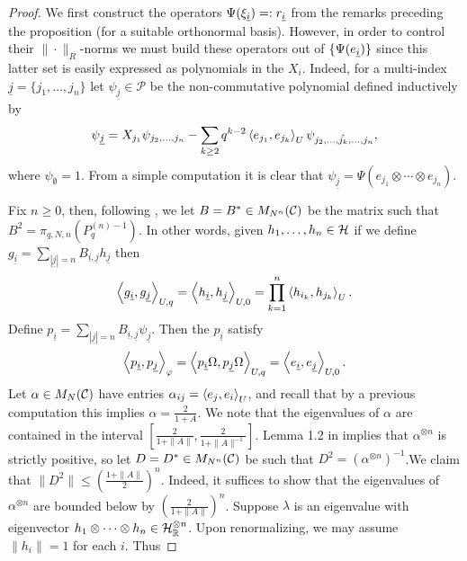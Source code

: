 \begin{proof}
We first construct the operators $\Psi(\xi_{\underline{i}})=:r_{\underline{i}}$ from the remarks preceding the proposition (for a suitable orthonormal basis). However, in order to control their $\|\cdot\|_R$-norms we must build these operators out of $\{\Psi(e_{\underline{i}})\}$ since this latter set is easily expressed as polynomials in the $X_i$. Indeed, for a multi-index $\underline{j}=\{j_1,\ldots,j_n\}$ let $\psi_{\underline{j}}\in\mathscr{P}$ be the non-commutative polynomial defined inductively by
	\begin{align}\label{recursive_psi}
		\psi_{\underline{j}}=X_{j_1}\psi_{j_2,\ldots,j_n} - \sum_{k\geq 2} q^{k-2}\left\langle e_{j_1},e_{j_k}\right\rangle_U\psi_{j_2,\ldots,\hat{j_k},\ldots,j_n},
	\end{align}
where $\psi_{\emptyset}=1$. From a simple computation it is clear that $\psi_{\underline{j}}=\Psi(e_{j_1}\otimes\cdots\otimes e_{j_n})$.\par
Fix $n\geq 0$,  then, following \cite{D}, we let $B=B^*\in M_{N^n}(\mathcal C)$ be the matrix such that $B^2=\pi_{q,N,n}\left(P_q^{(n)-1}\right)$. In other words, given $h_1,\ldots,h_n\in \mathcal H$ if we define $g_{\underline{i}}=\sum_{|\underline{j}|=n} B_{\underline{i},\underline{j}} h_{\underline{j}}$ then
	\begin{equation*}
		\left\langle g_{\underline{i}}, g_{\underline{j}}\right\rangle_{U,q} = \left\langle h_{\underline{i}}, h_{\underline{j}}\right\rangle_{U,0} = \prod_{k=1}^n \left\langle h_{i_k},h_{j_k}\right\rangle_U.
	\end{equation*}
Define $p_{\underline{i}}=\sum_{|\underline{j}|=n} B_{\underline{i},\underline{j}}\psi_{\underline{j}}$. Then the $p_{\underline{i}}$ satisfy
	\begin{equation*}
		\left\langle p_{\underline{i}},p_{\underline{j}}\right\rangle_{\varphi} =\left\langle p_{\underline{i}}\Omega, p_{\underline{j}}\Omega\right\rangle_{U,q}= \left\langle e_{\underline{i}},e_{\underline{j}}\right\rangle_{U,0}.
	\end{equation*}
Let $\alpha\in M_N(\mathcal C)$ have entries $\alpha_{ij}=\left\langle e_j,e_i\right\rangle_U$, and recall that by a previous computation this implies $\alpha=\frac{2}{1+A}$. We note that the eigenvalues of $\alpha$ are contained in the interval $\left[ \frac{2}{1+\|A\|},\frac{2}{1+\|A\|^{-1}}\right]$. Lemma 1.2 in \cite{Hia03} implies that $\alpha^{\otimes n}$ is strictly positive, so let $D=D^*\in M_{N^n}(\mathcal C)$ be such that $D^2=\left(\alpha^{\otimes n}\right)^{-1}$.We claim that $\|D^2\| \leq  \left(\frac{1+\|A\|}{2}\right)^{n}$. Indeed, it suffices to show that the eigenvalues of $\alpha^{\otimes n}$ are bounded below by $\left(\frac{2}{1+\|A\|}\right)^n$. Suppose $\lambda$ is an eigenvalue with eigenvector $h_1\otimes \cdots \otimes h_n\in \mathcal H_{\mathbb{R}}^{\otimes n}$. Upon renormalizing, we may assume $\|h_i\|=1$ for each $i$. Thus

\end{proof}
